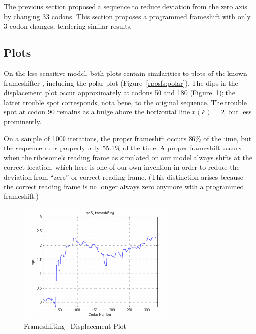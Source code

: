 \documentclass[10pt,twocolumn]{article}
\begin{document}
The previous section proposed a sequence to reduce deviation from the zero axis by changing 33 codons.
This section proposes a programmed frameshift with only 3 codon changes, tendering similar results.

\subsection{Plots}

On the less sensitive model, both plots contain similarities to plots of the known frameshifter \prfB,
including the polar plot (Figure~\ref{rposfs:polar}).
The dips in the displacement plot occur approximately at codons 50 and 180 (Figure~\ref{rposfs:disp});
the latter trouble spot corresponds, nota bene, to the original sequence.
The trouble spot at codon 90 remains as a bulge above the horizontal line $x(k)=2$,
but less prominently.

On a sample of 1000 iterations, the proper frameshift occurs 86\% of the time,
but the sequence runs properly only 55.1\% of the time. A proper frameshift occurs
when the ribosome's reading frame as simulated on our model always shifts at the
correct location, which here is one of our own invention in order to reduce the deviation
from ``zero'' or correct reading frame. (This distinction arises because the
correct reading frame is no longer always zero anymore with a programmed frameshift.)

\begin{figure}[htp]
    \centering
    \caption{Frameshifting \rpoS\ Displacement Plot}
    \label{rposfs:disp}
    \includegraphics{rpoS/frameshift.png}
\end{figure}
\end{document}

